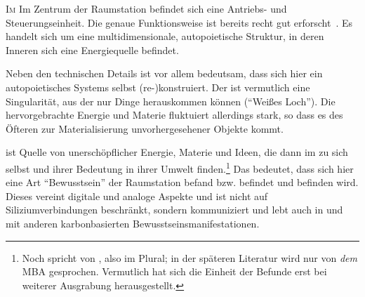 \begin{newstuff}
    \lettrine{I}{m}
    Im Zentrum der Raumstation befindet sich eine Antriebs- und Steuerungseinheit. Die genaue Funktionsweise ist bereits recht gut erforscht~\cite[S.~31ff]{cbasebook}. Es handelt  sich um eine multidimensionale, autopoietische Struktur, in deren Inneren sich eine Energiequelle befindet.


    Neben den technischen Details ist vor allem bedeutsam, dass sich hier ein autopoietisches Systems selbst (re-)konstruiert. 
    Der  ist vermutlich eine Singularität, aus der nur Dinge herauskommen können ("`Weißes Loch"'). Die hervorgebrachte Energie und Materie fluktuiert allerdings stark, so dass es des Öfteren zur Materialisierung unvorhergesehener Objekte kommt.


     ist Quelle von unerschöpflicher Energie, Materie und Ideen, die dann im  zu sich selbst und ihrer Bedeutung in ihrer Umwelt finden.\footnote{Noch \cite{cbasestarbasemanual} spricht von , also im Plural; in der späteren Literatur wird nur von \emph{dem} MBA gesprochen. Vermutlich  hat sich die Einheit der Befunde erst bei weiterer Ausgrabung herausgestellt.} 
    Das bedeutet, dass sich hier eine Art "`Bewusstsein"' der Raumstation befand bzw. befindet und befinden wird. 
    Dieses vereint digitale und analoge Aspekte und ist nicht auf Siliziumverbindungen beschränkt, sondern kommuniziert und lebt auch in und mit anderen karbonbasierten Bewusstseinsmanifestationen. 

    


\end{newstuff}
